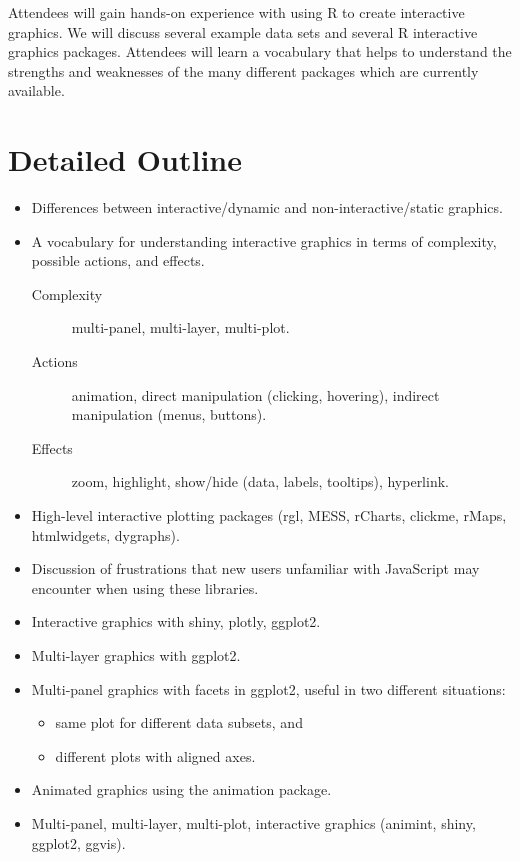 \documentclass[11pt]{article}
\begin{document}
Attendees will gain hands-on experience with using R to create
interactive graphics. We will discuss several example data sets and
several R interactive graphics packages. Attendees will learn a
vocabulary that helps to understand the strengths and weaknesses of
the many different packages which are currently available.

\section*{Detailed Outline}
\label{sec:orgheadline10}
\begin{itemize}
\item Differences between interactive/dynamic and non-interactive/static graphics.
\item A vocabulary for understanding interactive graphics in terms of
  complexity, possible actions, and effects.
\begin{description}
\item[Complexity] multi-panel, multi-layer, multi-plot.
\item[Actions] animation, direct manipulation (clicking, hovering), indirect manipulation
  (menus, buttons).
\item[Effects] zoom, highlight, show/hide (data, labels, tooltips),
  hyperlink.
\end{description}
\item High-level interactive plotting packages (rgl, MESS, rCharts,
  clickme, rMaps, htmlwidgets, dygraphs).
\item Discussion of frustrations that
new users unfamiliar with JavaScript may encounter when using these
libraries.
\item Interactive graphics with shiny, plotly, ggplot2.
\item Multi-layer graphics with ggplot2.
\item Multi-panel graphics with facets in ggplot2, useful in two
  different situations:
\begin{itemize}
\item same plot for different data subsets, and
\item different plots with aligned axes.
\end{itemize}
\item Animated graphics using the animation package.
\item Multi-panel, multi-layer, multi-plot, interactive graphics
  (animint, shiny, ggplot2, ggvis).
\end{itemize}
\end{document}
